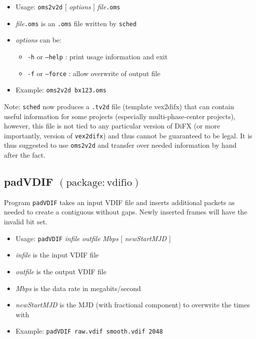 \begin{itemize}
\item[] Usage: {\tt oms2v2d} $[$ {\em options} $]$ {\em file}{\tt .oms}

\item[] {\em file}{\tt .oms} is an {\tt .oms} file written by {\tt sched}
\item[] {\em options} can be:
\begin{itemize}
\item[] {\tt -h} or {\tt --help} : print usage information and exit
\item[] {\tt -f} or {\tt --force} : allow overwrite of output file
\end{itemize}
\item[] Example: {\tt oms2v2d bx123.oms}
\end{itemize}

\noindent
Note: {\tt sched} now produces a {\tt .tv2d} file (template vex2difx) that can contain useful information for some projects (especially multi-phase-center projects), however, this file is not tied to any particular version of DiFX (or more importantly, version of {\tt vex2difx}) and thus cannot be guaranteed to be legal.
It is thus suggested to use {\tt oms2v2d} and transfer over needed information by hand after the fact.








\subsection{padVDIF {\small $\mathrm{(package: vdifio)}$} \label{sec:padVDIF}}

Program {\tt padVDIF} takes an input VDIF file and inserts additional packets as needed to create a contiguous without gaps.
Newly inserted frames will have the invalid bit set.

\begin{itemize}
\item[] Usage: {\tt padVDIF} {\em infile} {\em outfile} {\em Mbps} $[$ {\em newStartMJD} $]$

\item[] {\em infile} is the input VDIF file
\item[] {\em outfile} is the output VDIF file
\item[] {\em Mbps} is the data rate in megabits/second
\item[] {\em newStartMJD} is the MJD (with fractional component) to overwrite the times with

\item[] Example: {\tt padVDIF raw.vdif smooth.vdif 2048}
\end{itemize}





